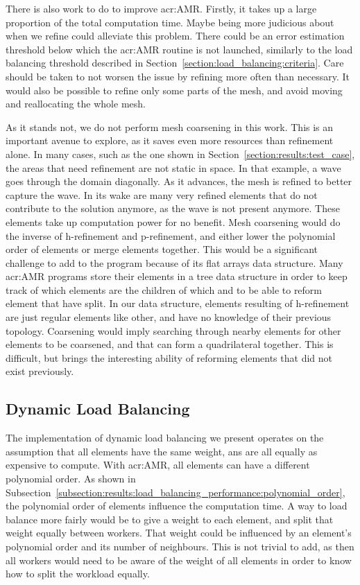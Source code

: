 There is also work to do to improve \acrlong{acr:AMR}. Firstly, it takes up a large proportion of
the total computation time. Maybe being more judicious about when we refine could alleviate this
problem. There could be an error estimation threshold below which the \acrshort{acr:AMR} routine is
not launched, similarly to the load balancing threshold described in
Section~\ref{section:load_balancing:criteria}. Care should be taken to not worsen the issue by
refining more often than necessary. It would also be possible to refine only some parts of the mesh,
and avoid moving and reallocating the whole mesh.

As it stands not, we do not perform mesh coarsening in this work. This is an important avenue to
explore, as it saves even more resources than refinement alone. In many cases, such as the one shown
in Section~\ref{section:results:test_case}, the areas that need refinement are not static in space.
In that example, a wave goes through the domain diagonally. As it advances, the mesh is refined to
better capture the wave. In its wake are many very refined elements that do not contribute to the
solution anymore, as the wave is not present anymore. These elements take up computation power for
no benefit. Mesh coarsening would do the inverse of h-refinement and p-refinement, and either lower
the polynomial order of elements or merge elements together. This would be a significant challenge
to add to the program because of its flat arrays data structure. Many \acrshort{acr:AMR} programs
store their elements in a tree data structure in order to keep track of which elements are the
children of which and to be able to reform element that have split. In our data structure, elements
resulting of h-refinement are just regular elements like other, and have no knowledge of their
previous topology. Coarsening would imply searching through nearby elements for other elements to be
coarsened, and that can form a quadrilateral together. This is difficult, but brings the interesting
ability of reforming elements that did not exist previously.

\subsection{Dynamic Load Balancing}\label{subsection:conclusion:future_work:load_balancing}

The implementation of dynamic load balancing we present operates on the assumption that all elements
have the same weight, ans are all equally as expensive to compute. With \acrshort{acr:AMR}, all
elements can have a different polynomial order. As shown in
Subsection~\ref{subsection:results:load_balancing_performance:polynomial_order}, the polynomial
order of elements influence the computation time. A way to load balance more fairly would be to give
a weight to each element, and split that weight equally between workers. That weight could be
influenced by an element's polynomial order and its number of neighbours. This is not trivial to
add, as then all workers would need to be aware of the weight of all elements in order to know how
to split the workload equally.

